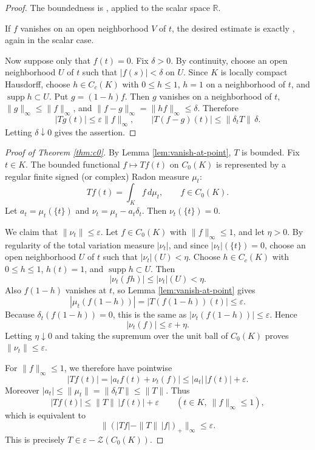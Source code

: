\documentclass[11pt]{article}
\newcommand{\eps}{\varepsilon}
\newcommand{\Z}{\mathcal Z}
\begin{document}
\begin{proof}
The boundedness is \cite[Theorem 3.13]{OT}, applied to the scalar space
\(\mathbb R\).

If \(f\) vanishes on an open neighborhood \(V\) of \(t\), the desired estimate
is exactly \cite[Lemma 3.9]{OT}, again in the scalar case.

Now suppose only that \(f(t)=0\). Fix \(\delta>0\). By continuity, choose an
open neighborhood \(U\) of \(t\) such that \(|f(s)|<\delta\) on \(U\). Since
\(K\) is locally compact Hausdorff, choose \(h\in C_c(K)\) with
\(0\le h\le1\), \(h=1\) on a neighborhood of \(t\), and
\(\operatorname{supp}h\subset U\). Put \(g=(1-h)f\). Then \(g\) vanishes on
a neighborhood of \(t\), \(\|g\|_\infty\le\|f\|_\infty\), and
\(\|f-g\|_\infty=\|hf\|_\infty\le\delta\). Therefore
\[
 |Tg(t)|\le \eps\|f\|_\infty,
 \qquad
 |T(f-g)(t)|\le \|\delta_t T\|\,\delta .
\]
Letting \(\delta\downarrow0\) gives the assertion.
\end{proof}

\begin{proof}[Proof of Theorem \ref{thm:c0}]
By Lemma \ref{lem:vanish-at-point}, \(T\) is bounded. Fix \(t\in K\). The
bounded functional \(f\mapsto Tf(t)\) on \(C_0(K)\) is represented by a
regular finite signed (or complex) Radon measure \(\mu_t\):
\[
 Tf(t)=\int_K f\,d\mu_t,\qquad f\in C_0(K).
\]
Let \(a_t=\mu_t(\{t\})\) and \(\nu_t=\mu_t-a_t\delta_t\). Then
\(\nu_t(\{t\})=0\).

We claim that \(\|\nu_t\|\le\eps\). Let \(f\in C_0(K)\) with
\(\|f\|_\infty\le1\), and let \(\eta>0\). By regularity of the total variation
measure \(|\nu_t|\), and since \(|\nu_t|(\{t\})=0\), choose an open
neighborhood \(U\) of \(t\) such that \(|\nu_t|(U)<\eta\). Choose
\(h\in C_c(K)\) with \(0\le h\le1\), \(h(t)=1\), and
\(\operatorname{supp}h\subset U\). Then
\[
 |\nu_t(fh)|\le |\nu_t|(U)<\eta.
\]
Also \(f(1-h)\) vanishes at \(t\), so Lemma \ref{lem:vanish-at-point} gives
\[
 |\mu_t(f(1-h))|=|T(f(1-h))(t)|\le\eps .
\]
Because \(\delta_t(f(1-h))=0\), this is the same as
\(|\nu_t(f(1-h))|\le\eps\). Hence
\[
 |\nu_t(f)|\le \eps+\eta.
\]
Letting \(\eta\downarrow0\) and taking the supremum over the unit ball of
\(C_0(K)\) proves \(\|\nu_t\|\le\eps\).

For \(\|f\|_\infty\le1\), we therefore have pointwise
\[
 |Tf(t)|=|a_t f(t)+\nu_t(f)|
 \le |a_t|\,|f(t)|+\eps .
\]
Moreover \(|a_t|\le\|\mu_t\|=\|\delta_t T\|\le\|T\|\). Thus
\[
 |Tf(t)|\le \|T\|\,|f(t)|+\eps
 \qquad (t\in K,\ \|f\|_\infty\le1),
\]
which is equivalent to
\[
 \big\|(|Tf|-\|T\|\,|f|)_+\big\|_\infty\le\eps.
\]
This is precisely \(T\in\eps-\Z(C_0(K))\).
\end{proof}
\end{document}

